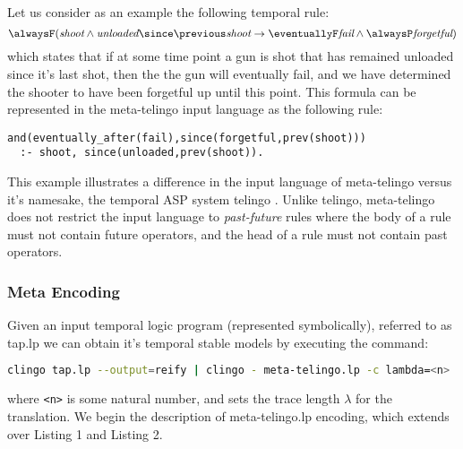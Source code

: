 Let us consider as an example the following temporal rule:
\begin{equation*}
\alwaysF(\textit{shoot} \wedge \textit{unloaded} \since \previous \textit{shoot} 
\rightarrow \eventuallyF \textit{fail} \wedge \alwaysP \textit{forgetful})
\end{equation*}
which states that if at some time point a gun is shot that has
remained unloaded since it's last shot, then the the gun will
eventually fail, and we have determined the shooter to have been
forgetful up until this point. This formula can be represented in the
meta-telingo input language as the following rule:
\begin{center}
    \begin{lstlisting}[numbers=none]
and(eventually_after(fail),since(forgetful,prev(shoot))) 
  :- shoot, since(unloaded,prev(shoot)).
    \end{lstlisting}
\end{center}

This example illustrates a difference in the input language of
meta-telingo versus it's namesake, the temporal ASP system
telingo\cite{cakamosc19a} \cite{agcadipescscvi20a}. Unlike telingo,
meta-telingo does not restrict the input language to
\emph{past-future} rules \cite{agcadipescscvi20a} where the body of a
rule must not contain future operators, and the head of a rule must
not contain past operators.

\subsubsection{Meta Encoding}

Given an input temporal logic program (represented symbolically),
referred to as tap.lp we can obtain it's temporal stable models by
executing the command:

\begin{lstlisting}[language=bash,numbers=none]
clingo tap.lp --output=reify | clingo - meta-telingo.lp -c lambda=<n>
\end{lstlisting}

where \verb|<n>| is some natural number, and sets the trace length
$\lambda$ for the translation. We begin the description of
meta-telingo.lp encoding, which extends over Listing 1 and Listing 2.

